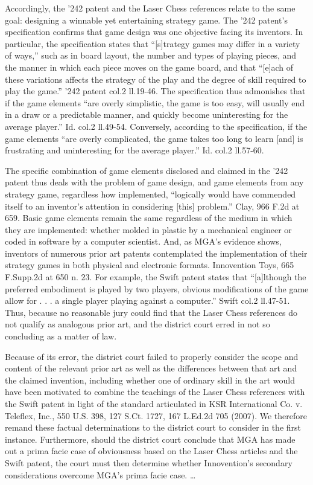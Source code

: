 Accordingly, the '242 patent and the Laser Chess references relate to the same
goal: designing a winnable yet entertaining strategy game. The '242 patent's
specification confirms that game design was one objective facing its inventors.
In particular, the specification states that ``[s]trategy games may differ in a
variety of ways,'' such as in board layout, the number and types of playing
pieces, and the manner in which each piece moves on the game board, and that
``[e]ach of these variations affects the strategy of the play and the degree of
skill required to play the game.'' '242 patent col.2 ll.19-46. The
specification thus admonishes that if the game elements ``are overly
simplistic, the game is too easy, will usually end in a draw or a predictable
manner, and quickly become uninteresting for the average player.'' Id. col.2
ll.49-54. Conversely, according to the specification, if the game elements
``are overly complicated, the game takes too long to learn [and] is frustrating
and uninteresting for the average player.'' Id. col.2 ll.57-60.

The specific combination of game elements disclosed and claimed in the '242
patent thus deals with the problem of game design, and game elements from any
strategy game, regardless how implemented, ``logically would have commended
itself to an inventor's attention in considering [this] problem.'' Clay, 966
F.2d at 659. Basic game elements remain the same regardless of the medium in
which they are implemented: whether molded in plastic by a mechanical engineer
or coded in software by a computer scientist. And, as MGA's evidence shows,
inventors of numerous prior art patents contemplated the implementation of
their strategy games in both physical and electronic formats. Innovention Toys,
665 F.Supp.2d at 650 n. 23. For example, the Swift patent states that
``[a]lthough the preferred embodiment is played by two players, obvious
modifications of the game allow for . . . a single player playing against a
computer.'' Swift col.2 ll.47-51. Thus, because no reasonable jury could find
that the Laser Chess references do not qualify as analogous prior art, and the
district court erred in not so concluding as a matter of law.

Because of its error, the district court failed to properly consider the scope
and content of the relevant prior art as well as the differences between that
art and the claimed invention, including whether one of ordinary skill in the
art would have been motivated to combine the teachings of the Laser Chess
references with the Swift patent in light of the standard articulated in KSR
International Co. v. Teleflex, Inc., 550 U.S. 398, 127 S.Ct. 1727, 167 L.Ed.2d
705 (2007). We therefore remand these factual determinations to the district
court to consider in the first instance. Furthermore, should the district court
conclude that MGA has made out a prima facie case of obviousness based on the
Laser Chess articles and the Swift patent, the court must then determine
whether Innovention's secondary considerations overcome MGA's prima facie case.
{\dots}

